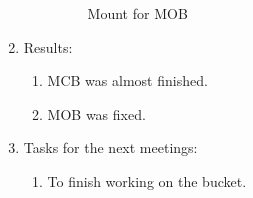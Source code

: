 \begin{enumerate}
\begin{enumerate}
\begin{figure}[H]
\begin{minipage}[h]{0.47\linewidth}
				\caption{Mount for MOB}
			\end{minipage}
		\end{figure}
		
	\end{enumerate}
	
	\item Results:
	\begin{enumerate}
		\item MCB was almost finished.
		
		\item MOB was fixed.
		
	\end{enumerate}
	
	\item Tasks for the next meetings:
	\begin{enumerate}
		\item To finish working on the bucket.
		
	\end{enumerate}     
\end{enumerate}
\fillpage

